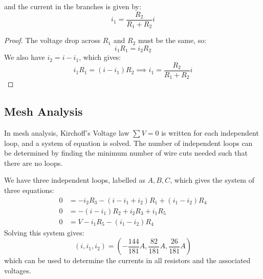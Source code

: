 \documentclass{article}
\newcommand{\equals}{=}
\begin{document}
    and the current in the branches is given by:
    \begin{equation}
        i_1 = \frac{R_2}{R_1+R_2}i
    \end{equation}
    \begin{proof}
        The voltage drop across $R_1$ and $R_2$ must be the same, so:
        \begin{equation}
            i_1R_1 = i_2R_2
        \end{equation}
        We also have $i_2=i-i_1$, which gives:
        \begin{equation}
            i_1R_1 = (i-i_1)R_2 \implies i_1 = \frac{R_2}{R_1+R_2}i
        \end{equation}
    \end{proof}
    \subsection{Mesh Analysis}
    In mesh analysis, Kirchoff's Voltage law $\sum V = 0$ is written for each independent loop, and a system of equation is solved. The number of independent loops can be determined by finding the minimum number of wire cuts needed such that there are no loops.
    \begin{center}
    \end{center}
    We have three independent loops, labelled as $A,B,C$, which gives the system of three equations:
    \begin{align}
        0 &= -i_2R_3-(i-i_1+i_2)R_1+(i_1-i_2)R_4 \\ 
        0 &= -(i-i_1)R_2 + i_2R_3 + i_1R_5 \\ 
        0 &= V - i_1R_5 - (i_1-i_2)R_4
    \end{align}
    Solving this system gives:
    \begin{equation}
        (i, i_1, i_2) =\left(-\frac{144}{181}\si{A}, \frac{82}{181}\si{A}, \frac{26}{181}\si{A}\right)
    \end{equation}
    which can be used to determine the currents in all resistors and the associated voltages.
\end{document}
